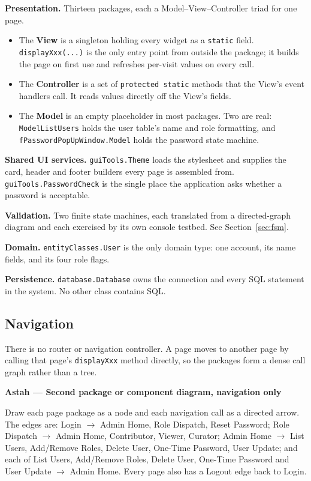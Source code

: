 \documentclass[11pt,a4paper]{article}
\newcommand{\astah}[1]{%
  \par\medskip\noindent
  {\color{accent}\bfseries Astah --- #1}\par\nopagebreak\smallskip}
\newcommand{\cls}[1]{\texttt{#1}}
\begin{document}
\textbf{Presentation.} Thirteen packages, each a Model--View--Controller triad for one page.

\begin{itemize}
  \item The \textbf{View} is a singleton holding every widget as a \cls{static} field.
        \cls{displayXxx(...)} is the only entry point from outside the package; it builds
        the page on first use and refreshes per-visit values on every call.
  \item The \textbf{Controller} is a set of \cls{protected static} methods that the View's
        event handlers call. It reads values directly off the View's fields.
  \item The \textbf{Model} is an empty placeholder in most packages. Two are real:
        \cls{ModelListUsers} holds the user table's name and role formatting, and
        \cls{fPasswordPopUpWindow.Model} holds the password state machine.
\end{itemize}

\textbf{Shared UI services.} \cls{guiTools.Theme} loads the stylesheet and supplies the card,
header and footer builders every page is assembled from. \cls{guiTools.PasswordCheck} is the
single place the application asks whether a password is acceptable.

\textbf{Validation.} Two finite state machines, each translated from a directed-graph
diagram and each exercised by its own console testbed. See Section~\ref{sec:fsm}.

\textbf{Domain.} \cls{entityClasses.User} is the only domain type: one account, its name
fields, and its four role flags.

\textbf{Persistence.} \cls{database.Database} owns the connection and every SQL statement in
the system. No other class contains SQL.

\subsection{Navigation}

There is no router or navigation controller. A page moves to another page by calling that
page's \cls{displayXxx} method directly, so the packages form a dense call graph rather than
a tree.

\astah{Second package or component diagram, navigation only}
Draw each page package as a node and each navigation call as a directed arrow. The edges
are: Login $\rightarrow$ Admin Home, Role Dispatch, Reset Password; Role Dispatch
$\rightarrow$ Admin Home, Contributor, Viewer, Curator; Admin Home $\rightarrow$ List Users,
Add/Remove Roles, Delete User, One-Time Password, User Update; and each of List Users,
Add/Remove Roles, Delete User, One-Time Password and User Update $\rightarrow$ Admin Home.
Every page also has a Logout edge back to Login.
\end{document}
